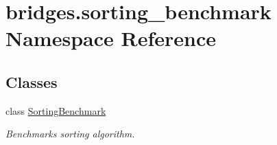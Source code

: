 \hypertarget{namespacebridges_1_1sorting__benchmark}{}\section{bridges.\+sorting\+\_\+benchmark Namespace Reference}
\label{namespacebridges_1_1sorting__benchmark}
\subsection*{Classes}
\begin{DoxyCompactItemize}
\item 
class \mbox{\hyperlink{classbridges_1_1sorting__benchmark_1_1_sorting_benchmark}{Sorting\+Benchmark}}
\begin{DoxyCompactList}\small\item\em Benchmarks sorting algorithm. \end{DoxyCompactList}\end{DoxyCompactItemize}

